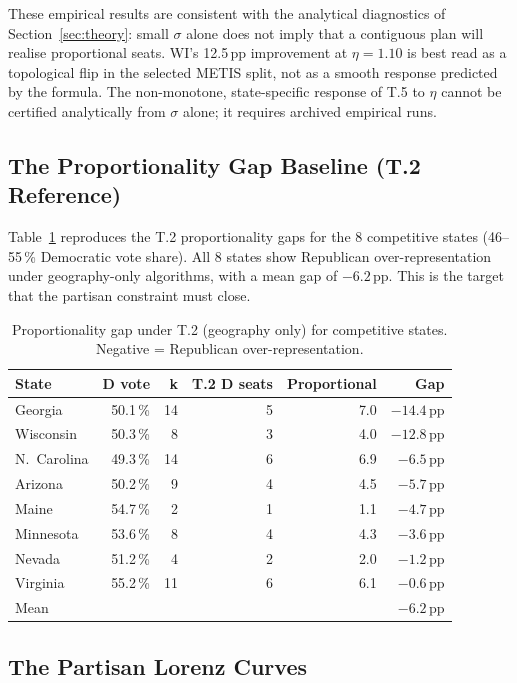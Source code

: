 These empirical results are consistent with the analytical diagnostics of
Section~\ref{sec:theory}: small $\sigma$ alone does not imply that a contiguous
plan will realise proportional seats. WI's 12.5\,pp improvement at
$\eta = 1.10$ is best read as a topological flip in the selected METIS split,
not as a smooth response predicted by the formula. The non-monotone,
state-specific response of T.5 to $\eta$ cannot be certified analytically from
$\sigma$ alone; it requires archived empirical runs.

\subsection{The Proportionality Gap Baseline (T.2 Reference)}

Table~\ref{tab:gap-baseline} reproduces the T.2 proportionality gaps for
the 8 competitive states (46--55\,\% Democratic vote share).
All 8 states show Republican over-representation under geography-only algorithms,
with a mean gap of $-6.2$\,pp.
This is the target that the partisan constraint must close.

\begin{table}[h]
\centering
\caption{Proportionality gap under T.2 (geography only) for competitive states.
Negative = Republican over-representation.}
\label{tab:gap-baseline}
\begin{tabular}{lrrrrr}
\toprule
State & D vote & k & T.2 D seats & Proportional & Gap \\
\midrule
Georgia   & 50.1\,\% & 14 & 5 & 7.0 & $-14.4$\,pp \\
Wisconsin & 50.3\,\% &  8 & 3 & 4.0 & $-12.8$\,pp \\
N.\ Carolina & 49.3\,\% & 14 & 6 & 6.9 & $-6.5$\,pp \\
Arizona   & 50.2\,\% &  9 & 4 & 4.5 & $-5.7$\,pp \\
Maine     & 54.7\,\% &  2 & 1 & 1.1 & $-4.7$\,pp \\
Minnesota & 53.6\,\% &  8 & 4 & 4.3 & $-3.6$\,pp \\
Nevada    & 51.2\,\% &  4 & 2 & 2.0 & $-1.2$\,pp \\
Virginia  & 55.2\,\% & 11 & 6 & 6.1 & $-0.6$\,pp \\
\midrule
Mean      &          &   &   &     & $-6.2$\,pp \\
\bottomrule
\end{tabular}
\end{table}

\subsection{The Partisan Lorenz Curves}

